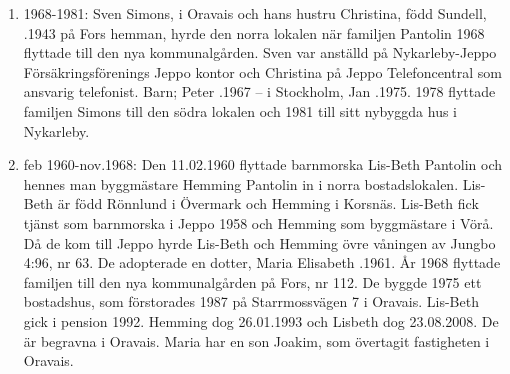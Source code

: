 \begin{enumerate}
  \item 1968-1981: Sven Simons,  i Oravais och hans hustru Christina, född Sundell, .1943 på Fors hemman, hyrde den norra lokalen när familjen Pantolin 1968 flyttade till den nya kommunalgården. Sven var anställd på Nykarleby-Jeppo Försäkringsförenings Jeppo kontor och Christina på Jeppo Telefoncentral som ansvarig telefonist. Barn;	Peter .1967	--   i Stockholm,		Jan	.1975.
  1978 flyttade familjen Simons till den södra lokalen och 1981 till sitt nybyggda hus i Nykarleby.
  \item feb 1960-nov.1968: Den 11.02.1960 flyttade barnmorska Lis-Beth Pantolin och hennes 	man byggmästare Hemming Pantolin in i norra bostadslokalen. Lis-Beth är född Rönnlund  i Övermark och Hemming  i Korsnäs. Lis-Beth fick tjänst som barnmorska i Jeppo 1958 och Hemming som byggmästare i Vörå. Då de kom till Jeppo hyrde Lis-Beth och Hemming övre våningen av Jungbo 4:96, nr 63. De adopterade en dotter, Maria Elisabeth .1961. År 1968 flyttade familjen till den nya 	kommunalgården på Fors, nr 112. De byggde 1975 ett bostadshus, som	förstorades 1987 på Starrmossvägen 7 i Oravais. Lis-Beth gick i pension 1992. Hemming dog 26.01.1993 och Lisbeth dog 23.08.2008. De är begravna i Oravais. Maria har en son Joakim, som övertagit fastigheten 	i Oravais.
\end{enumerate}


